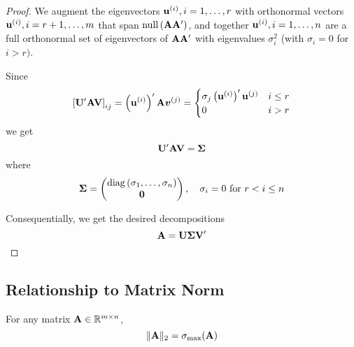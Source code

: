 \begin{proof}
	We augment the eigenvectors ${\bf u}^{(i)},i=1,\ldots,r$ with orthonormal vectors ${\bf u}^{(i)},i=r+1,\ldots,m$ that span $\operatorname{null}\left({\bf A}{\bf A}^{\prime}\right)$, and together ${\bf u}^{(i)},i=1,\ldots,n$ are a full orthonormal set of eigenvectors of ${\bf A}{\bf A}^{\prime}$ with eigenvalues $\sigma_{i}^{2}$ (with $\sigma_{i}=0$ for $i>r)$.

	Since
	\begin{equation*}
		\left[\mathbf{U}^{\prime}{\bf A}\mathbf{V}\right]_{ij}=\left({\bf u}^{(i)}\right)^{\prime}{\bf A}\boldsymbol{v}^{(j)}=\begin{cases}\sigma_{j}\left({\bf u}^{(i)}\right)^{\prime}{\bf u}^{(j)} & i \leq r \\ 0 & i>r\end{cases}
	\end{equation*}
	we get
	\begin{equation*}
		\mathbf{U}^{\prime}{\bf A}\mathbf{V}=\boldsymbol{\Sigma}
	\end{equation*}
	where
	\begin{equation*}
		\boldsymbol{\Sigma}=\begin{pmatrix}
			\operatorname{diag}\left(\sigma_{1},\ldots,\sigma_{n}\right) \\
			\mathbf{0}
		\end{pmatrix}
		,\quad\sigma_{i}=0\text { for } r<i\leq n
	\end{equation*}

	Consequentially, we get the desired decompositions
	\begin{equation*}
		{\bf A}=\mathbf{U}\boldsymbol{\Sigma}\mathbf{V}^{\prime}
	\end{equation*}
\end{proof}

\subsection{Relationship to Matrix Norm}

\begin{theorem}
	For any matrix ${\bf A}\in{\mathbb R}^{m\times n}$,
	\begin{equation}
		\|{\bf A}\|_{2}=\sigma_{\max}({\bf A})
	\end{equation}
\end{theorem}

